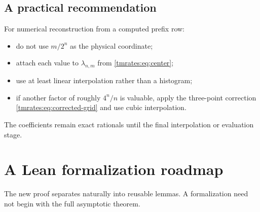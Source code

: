 \documentclass[11pt,oneside]{article}
\theoremstyle{definition}
\theoremstyle{remark}
\begin{document}
\subsection{A practical recommendation}

For numerical reconstruction from a computed prefix row:
\begin{itemize}
\item do not use $m/2^n$ as the physical coordinate;
\item attach each value to $\lambda_{n,m}$ from \eqref{tmrates:eq:center};
\item use at least linear interpolation rather than a histogram;
\item if another factor of roughly $4^n/n$ is valuable, apply the three-point correction
      \eqref{tmrates:eq:corrected-grid} and use cubic interpolation.
\end{itemize}
The coefficients remain exact rationals until the final interpolation or evaluation stage.

\section{A Lean formalization roadmap}
\label{tmrates:sec:lean-roadmap}

The new proof separates naturally into reusable lemmas.  A formalization need not begin with
the full asymptotic theorem.
\end{document}
